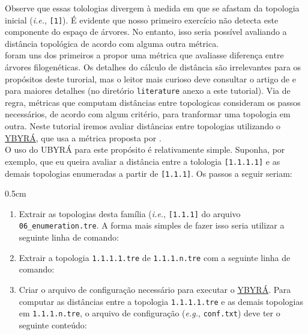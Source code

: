 \begin{refsection}
Observe que essas tolologias divergem à medida em que se afastam da topologia inicial (\textit{i.e.}, \texttt{[1]}). É evidente que nosso primeiro exercício não detecta este componente do espaço de árvores. No entanto, isso seria possível avaliando a distância topológica de acordo com alguma outra métrica.\\

	\textcite{Robinson_and_Foulds_1981} foram uns dos primeiros a propor uma métrica que avaliasse diferença entre árvores filogenéticas. Os detalhes do cálculo de distância são irrelevantes para os propósitos deste turorial, mas o leitor mais curioso deve consultar o artigo de \textcite{Robinson_and_Foulds_1981} e \textcite{BogdanowiczETGiaro_2013} para maiores detalhes (no diretório \texttt{literature} anexo a este tutorial). Via de regra, métricas que computam distâncias entre topologicas consideram os passos necessários, de acordo com algum critério, para tranformar uma topologia em outra. Neste tutorial iremos avaliar distâncias entre topologias utilizando o \href{http://www.ib.usp.br/grant/anfibios/researchSoftware.html/}{YBYRÁ}, que usa a métrica proposta por \textcite{Robinson_and_Foulds_1981}.\\

	O uso do UBYRÁ para este propósito é relativamente simple. Suponha, por exemplo, que eu queira avaliar a distância entre a tolologia \texttt{[1.1.1.1]} e as demais topologias enumeradas a partir de \texttt{[1.1.1]}. Os passos a seguir seriam:

\begin {myindentpar}{0.5cm}
\begin{enumerate}[\itshape i.]
	\item{} Extrair as topologias desta família (\textit{i.e.}, \texttt{[1.1.1]} do arquivo \texttt{06\_enumeration.tre}. A forma mais simples de fazer isso seria utilizar a seguinte linha de comando:

\shellcmd{egrep '\textbackslash[1\textbackslash.1\textbackslash.1\textbackslash..*' 06\_enumeration.tre > 1.1.1.n.tre}

	\item{} Extrair a topologia \texttt{1.1.1.1.tre} de \texttt{1.1.1.n.tre} com a seguinte linha de comando:


	\item{} Criar o arquivo de configuração necessário para executar o \href{http://www.ib.usp.br/grant/anfibios/researchSoftware.html/}{YBYRÁ}. Para computar as distâncias entre a topologia \texttt{1.1.1.1.tre} e as demais topologias em \texttt{1.1.1.n.tre}, o arquivo de configuração (\textit{e.g.}, \texttt{conf.txt}) deve ter o seguinte conteúdo:


\end{enumerate}
\end{myindentpar}
\end{refsection}
